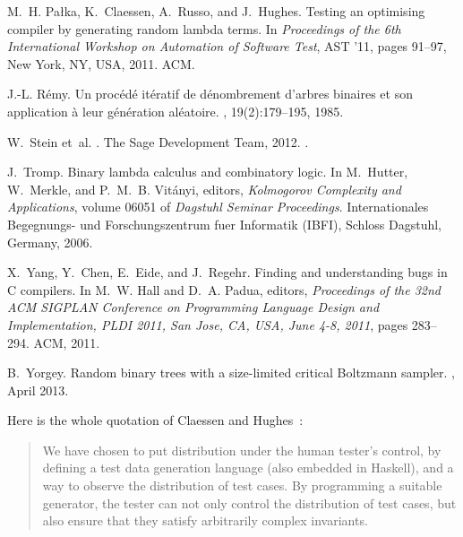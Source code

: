 \documentclass{sig-alternate}
\begin{document}
\begin{thebibliography}{10}
M.~H. Pa{\l}ka, K.~Claessen, A.~Russo, and J.~Hughes.
\newblock Testing an optimising compiler by generating random lambda terms.
\newblock In {\em Proceedings of the 6th International Workshop on Automation
  of Software Test}, AST '11, pages 91--97, New York, NY, USA, 2011. ACM.

J.-L. R\'{e}my.
\newblock Un proc{\'e}d{\'e} it{\'e}ratif de d{\'e}nombrement d'arbres binaires
  et son application \`{a} leur g{\'e}n{\'e}ration al{\'e}atoire.
, 19(2):179--195, 1985.

W.~Stein et~al.
.
\newblock The Sage Development Team, 2012.
.

J.~Tromp.
\newblock Binary lambda calculus and combinatory logic.
\newblock In M.~Hutter, W.~Merkle, and P.~M.~B. Vit{\'a}nyi, editors, {\em
  Kolmogorov Complexity and Applications}, volume 06051 of {\em Dagstuhl
  Seminar Proceedings}. Internationales Begegnungs- und Forschungszentrum fuer
  Informatik (IBFI), Schloss Dagstuhl, Germany, 2006.

X.~Yang, Y.~Chen, E.~Eide, and J.~Regehr.
\newblock Finding and understanding bugs in {C} compilers.
\newblock In M.~W. Hall and D.~A. Padua, editors, {\em Proceedings of the 32nd
  {ACM SIGPLAN} {Conference on Programming Language Design and Implementation},
  {PLDI} 2011, {San Jose, CA, USA, June 4-8}, 2011}, pages 283--294. ACM, 2011.

B.~Yorgey.
\newblock Random binary trees with a size-limited critical {Boltzmann} sampler.
, April 2013.

\end{thebibliography}

\appendix
Here is the whole quotation of Claessen and Hughes~\cite{DBLP:conf/icfp/ClaessenH00}:

\begin{quotation}
  \begin{it}
    We have chosen to put distribution under the human tester's control, by defining
    a test data generation language (also embedded in Haskell), and a way to observe
    the distribution of test cases. By programming a suitable generator, the tester
    can not only control the distribution of test cases, but also ensure that they
    satisfy arbitrarily complex invariants.  
  \end{it}
\end{quotation}
\end{document}

